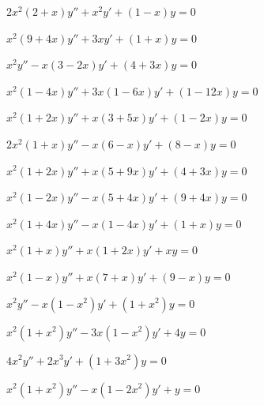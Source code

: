 \begin{exerciselist}
\item\label{exer:7.6.17}$2x^2(2+x)y''+x^2y'+(1-x)y=0$

\item\label{exer:7.6.18}$x^2(9+4x)y''+3xy'+(1+x)y=0$

\item\label{exer:7.6.19}$x^2y''-x(3-2x)y'+(4+3x)y=0$

\item\label{exer:7.6.20}$x^2(1-4x)y''+3x(1-6x)y'+(1-12x)y=0$

\item\label{exer:7.6.21}$x^2(1+2x)y''+x(3+5x)y'+(1-2x)y=0$

\item\label{exer:7.6.22}$2x^2(1+x)y''-x(6-x)y'+(8-x)y=0$


\item\label{exer:7.6.23}\Cex $x^2(1+2x)y''+x(5+9x)y'+(4+3x)y=0$

\item\label{exer:7.6.24}\Cex $x^2(1-2x)y''-x(5+4x)y'+(9+4x)y=0$

\item\label{exer:7.6.25}\Cex
$x^2(1+4x)y''-x(1-4x)y'+(1+x)y=0$

\item\label{exer:7.6.26}\Cex
$x^2(1+x)y''+x(1+2x)y'+xy=0$

\item\label{exer:7.6.27}\Cex
$x^2(1-x)y''+x(7+x)y'+(9-x)y=0$


\item\label{exer:7.6.28}$x^2y''-x(1-x^2)y'+(1+x^2)y=0$

\item\label{exer:7.6.29}$x^2(1+x^2)y''-3x(1-x^2)y'+4y=0$

\item\label{exer:7.6.30}$4x^2y''+2x^3y'+(1+3x^2)y=0$

\item\label{exer:7.6.31}$x^2(1+x^2)y''-x(1-2x^2)y'+y=0$


\end{exerciselist}

